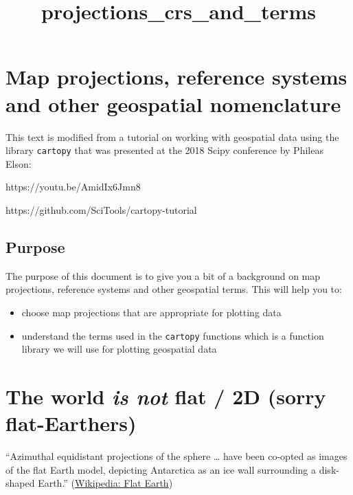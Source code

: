 \documentclass[11pt]{article}
\title{projections\_crs\_and\_terms}
\providecommand{\tightlist}{%
      \setlength{\itemsep}{0pt}\setlength{\parskip}{0pt}}
\begin{document}
    
    
    \maketitle
    
    

    
    \hypertarget{map-projections-reference-systems-and-other-geospatial-nomenclature}{%
\section{Map projections, reference systems and other geospatial
nomenclature}\label{map-projections-reference-systems-and-other-geospatial-nomenclature}}

This text is modified from a tutorial on working with geospatial data
using the library \texttt{cartopy} that was presented at the 2018 Scipy
conference by Phileas Elson:

https://youtu.be/AmidIx6Jmn8

https://github.com/SciTools/cartopy-tutorial

    \hypertarget{purpose}{%
\subsection{Purpose}\label{purpose}}

The purpose of this document is to give you a bit of a background on map
projections, reference systems and other geospatial terms. This will
help you to:

\begin{itemize}
\tightlist
\item
  choose map projections that are appropriate for plotting data
\item
  understand the terms used in the \texttt{cartopy} functions which is a
  function library we will use for plotting geospatial data
\end{itemize}

    \hypertarget{the-world-is-not-flat-2d-sorry-flat-earthers}{%
\section{\texorpdfstring{The world \emph{is not} flat / 2D (sorry
flat-Earthers)}{The world is not flat / 2D (sorry flat-Earthers)}}\label{the-world-is-not-flat-2d-sorry-flat-earthers}}

``Azimuthal equidistant projections of the sphere \ldots{} have been
co-opted as images of the flat Earth model, depicting Antarctica as an
ice wall surrounding a disk-shaped Earth.''
(\href{https://en.wikipedia.org/wiki/Flat_Earth\#Flat_Earth_Society}{Wikipedia:
Flat Earth})
\end{document}
